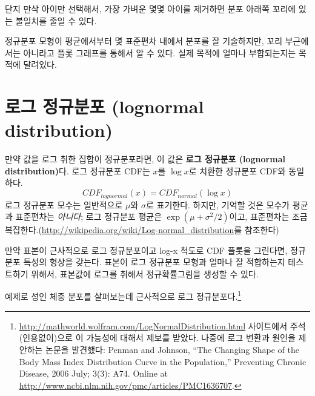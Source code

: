 
단지 만삭 아이만 선택해서, 가장 가벼운 몇몇 아이를 제거하면 분포 아래쪽 꼬리에 있는 불일치를 줄일 수 있다.

정규분포 모형이 평균에서부터 몇 표준편차 내에서 분포를 잘 기술하지만, 꼬리 부근에서는 아니라고 플롯 그래프를 통해서 알 수 있다.
실제 목적에 얼마나 부합되는지는 목적에 달려있다.


\section{로그 정규분포 (lognormal distribution)}
\label{brfss}
\label{lognormal}

만약 값을 로그 취한 집합이 정규분포라면, 이 값은 {\bf 로그 정규분포 (lognormal distribution)}다. 로그 정규분포 CDF는 $x$를 $\log x$로 치환한 정규분포 CDF와 동일하다.
%
\[ CDF_{lognormal}(x) = CDF_{normal}(\log x)\]
%
로그 정규분포 모수는 일반적으로 $\mu$와 $\sigma$로 표기한다.
하지만, 기억할 것은 모수가 평균과 표준편차는 {\em 아니다};
로그 정규분포 평균은 $\exp(\mu +\sigma^2/2)$이고, 표준편차는 조금 복잡한다.(\url{http://wikipedia.org/wiki/Log-normal_distribution}를 참조한다)

\begin{figure}
\end{figure}

만약 표본이 근사적으로 로그 정규분포이고 log-x 척도로 CDF 플롯을 그린다면, 정규분포 특성의 형상을 갖는다.
표본이 로그 정규분포 모형과 얼마나 잘 적합하는지 테스트하기 위해서, 
표본값에 로그를 취해서 정규확률그림을 생성할 수 있다.


예제로 성인 체중 분포를 살펴보는데 근사적으로 로그 정규분포다.\footnote{\url{http://mathworld.wolfram.com/LogNormalDistribution.html} 사이트에서 주석(인용없이)으로 이 가능성에 대해서 제보를 받았다.
나중에 로그 변환과 원인을 제안하는 논문을 발견했다: Penman and Johnson, ``The Changing Shape of the Body Mass Index Distribution Curve in the Population,'' Preventing Chronic Disease, 2006 July; 3(3): A74.  Online at \url{http://www.ncbi.nlm.nih.gov/pmc/articles/PMC1636707}.}


